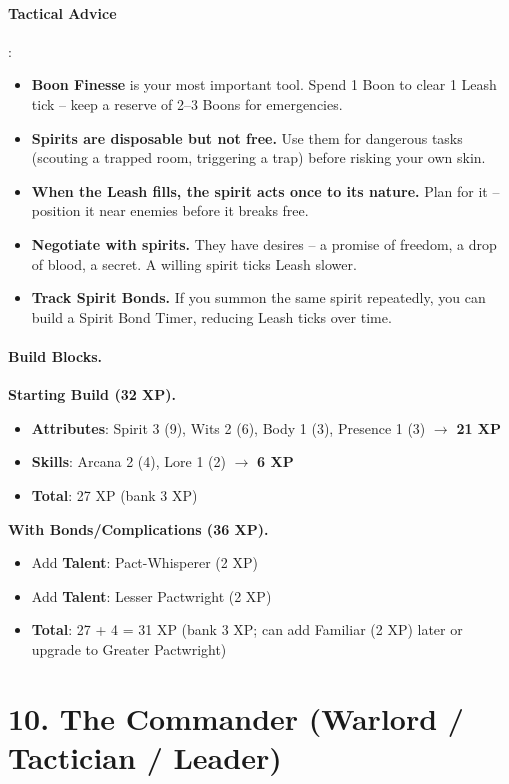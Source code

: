 \paragraph{Tactical Advice}:
\begin{itemize}
\item \textbf{Boon Finesse} is your most important tool. Spend 1 Boon to clear 1 Leash tick -- keep a reserve of 2--3 Boons for emergencies.
\item \textbf{Spirits are disposable but not free.} Use them for dangerous tasks (scouting a trapped room, triggering a trap) before risking your own skin.
\item \textbf{When the Leash fills, the spirit acts once to its nature.} Plan for it -- position it near enemies before it breaks free.
\item \textbf{Negotiate with spirits.} They have desires -- a promise of freedom, a drop of blood, a secret. A willing spirit ticks Leash slower.
\item \textbf{Track Spirit Bonds.} If you summon the same spirit repeatedly, you can build a Spirit Bond Timer, reducing Leash ticks over time.
\end{itemize}

\paragraph{Build Blocks.}
\textbf{Starting Build (32 XP).}
\begin{itemize}
\item \textbf{Attributes}: Spirit 3 (9), Wits 2 (6), Body 1 (3), Presence 1 (3) \(\rightarrow\) \textbf{21 XP}
\item \textbf{Skills}: Arcana 2 (4), Lore 1 (2) \(\rightarrow\) \textbf{6 XP}
\item \textbf{Total}: 27 XP (bank 3 XP)
\end{itemize}
\textbf{With Bonds/Complications (36 XP).}
\begin{itemize}
\item Add \textbf{Talent}: Pact-Whisperer (2 XP)
\item Add \textbf{Talent}: Lesser Pactwright (2 XP)
\item \textbf{Total}: 27 + 4 = 31 XP (bank 3 XP; can add Familiar (2 XP) later or upgrade to Greater Pactwright)
\end{itemize}

\section{10. The Commander (Warlord / Tactician / Leader)}
\label{sec:concept-commander}

